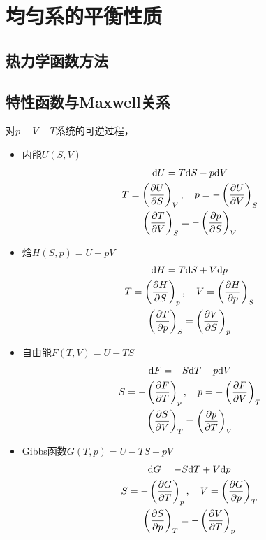 \chapter{均匀系的平衡性质}

\section*{热力学函数方法}

\section{特性函数与Maxwell关系}

对$p-V-T$系统的可逆过程，
\begin{itemize}
    \item 内能$U(S,V)$
    \begin{gather*}
        \mathrm{d} U = T \mathrm{d} S - p \mathrm{d} V
        \\
        T = \left(\frac{\partial U}{\partial S}\right)_V,\quad p = -\left(\frac{\partial U}{\partial V}\right)_S
        \\
        \left(\frac{\partial T}{\partial V}\right)_S = -\left(\frac{\partial p}{\partial S}\right)_V
    \end{gather*}
    \item 焓$H(S,p) = U + pV$
    \begin{gather*}
        \mathrm{d} H = T \mathrm{d} S + V \mathrm{d} p
        \\
        T = \left(\frac{\partial H}{\partial S}\right)_p,\quad V = \left(\frac{\partial H}{\partial p}\right)_S
        \\
        \left(\frac{\partial T}{\partial p}\right)_S = \left(\frac{\partial V}{\partial S}\right)_p
    \end{gather*}
    \item 自由能$F(T,V) = U - TS$
    \begin{gather*}
        \mathrm{d} F = -S \mathrm{d} T - p \mathrm{d} V
        \\
        S = -\left(\frac{\partial F}{\partial T}\right)_p,\quad p = -\left(\frac{\partial F}{\partial V}\right)_T
        \\
        \left(\frac{\partial S}{\partial V}\right)_T = \left(\frac{\partial p}{\partial T}\right)_V
    \end{gather*}
    \item Gibbs函数$G(T,p) = U - TS + pV$
    \begin{gather*}
        \mathrm{d} G = -S \mathrm{d} T + V \mathrm{d} p
        \\
        S = -\left(\frac{\partial G}{\partial T}\right)_p,\quad V = \left(\frac{\partial G}{\partial p}\right)_T
        \\
        \left(\frac{\partial S}{\partial p}\right)_T = -\left(\frac{\partial V}{\partial T}\right)_p
    \end{gather*}
\end{itemize}

